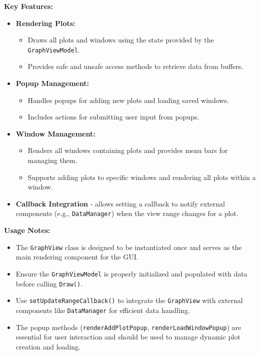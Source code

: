 \documentclass{article}
\begin{document}
\vspace{5pt}
\noindent
\textbf{Key Features:}
\begin{itemize}
    \item \textbf{Rendering Plots:}
    \begin{itemize}
        \item Draws all plots and windows using the state provided by the \texttt{GraphViewModel}.

        \item Provides safe and unsafe access methods to retrieve data from buffers.
    \end{itemize}
    
    \item \textbf{Popup Management:}
    \begin{itemize}
        \item Handles popups for adding new plots and loading saved windows.

        \item Includes actions for submitting user input from popups.
    \end{itemize}
    
    \item \textbf{Window Management:}
    \begin{itemize}
        \item Renders all windows containing plots and provides menu bars for managing them.

        \item Supports adding plots to specific windows and rendering all plots within a window.
    \end{itemize}

    \item \textbf{Callback Integration} - allows setting a callback to notify external components (e.g., \texttt{DataManager}) when the view range changes for a plot.
\end{itemize}

\vspace{5pt}
\noindent
\textbf{Usage Notes:}
\begin{itemize}
    \item The \texttt{GraphView} class is designed to be instantiated once and serves as the main rendering component for the GUI.

    \item Ensure the \texttt{GraphViewModel} is properly initialized and populated with data before calling \texttt{Draw()}.

    \item Use \texttt{setUpdateRangeCallback()} to integrate the \texttt{GraphView} with external components like \texttt{DataManager} for efficient data handling.

    \item The popup methods (\texttt{renderAddPlotPopup}, \texttt{renderLoadWindowPopup}) are essential for user interaction and should be used to manage dynamic plot creation and loading.
\end{itemize}
\end{document}
